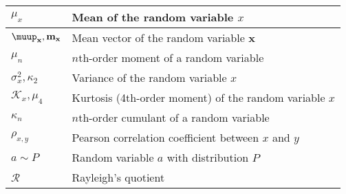\documentclass{article}
\begin{document}
\begin{xltabular}{\textwidth}{XX}
	\(\mu_x\)                                                                                                                                    & Mean of the random variable \(x\)                                                                                                                                       \\ \hline
	\(\boldsymbol{\muup}_\mathbf{x}, \mathbf{m}_\mathbf{x}\)                                                                                     & Mean vector of the random variable \(\mathbf{x}\) \cite{brownIntroductionRandomSignals1997}                                                                             \\ \hline
	\(\mu_n\)                                                                                                                                    & \(n\)th-order moment of a random variable                                                                                                                               \\ \hline
	\(\sigma_x^2, \kappa_2\)                                                                                                                     & Variance of the random variable \(x\)                                                                                                                                   \\ \hline
	\(\mathcal{K}_x, \mu_4\)                                                                                                                     & Kurtosis (4th-order moment) of the random variable \(x\)                                                                                                                \\ \hline
	\(\kappa_n\)                                                                                                                                 & \(n\)th-order cumulant of a random variable                                                                                                                             \\ \hline
	\(\rho_{x,y}\)                                                                                                                               & Pearson correlation coefficient between \(x\) and \(y\)                                                                                                                 \\ \hline
	\(a\sim P\)                                                                                                                                  & Random variable \(a\) with distribution \(P\)                                                                                                                           \\ \hline
	\(\mathcal{R}\)                                                                                                                              & Rayleigh's quotient
\end{xltabular}
\end{document}
